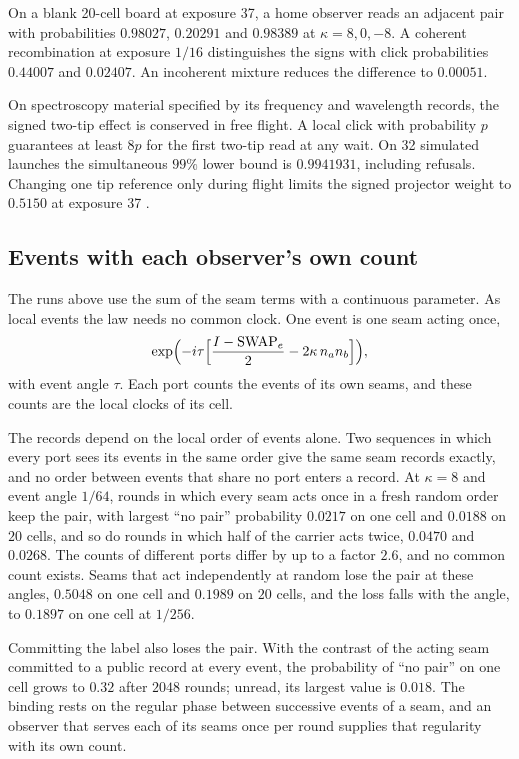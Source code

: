 \documentclass[11pt]{article}
\theoremstyle{definition}
\theoremstyle{remark}
\begin{document}
On a blank 20-cell board at exposure 37, a home observer reads an
adjacent pair with probabilities \(0.98027\), \(0.20291\) and \(0.98389\)
at \(\kappa=8,0,-8\). A coherent recombination at exposure \(1/16\)
distinguishes the signs with click probabilities \(0.44007\) and
\(0.02407\). An incoherent mixture reduces the difference to \(0.00051\).

On spectroscopy material specified by its frequency and wavelength
records, the signed two-tip effect is conserved in free flight. A local
click with probability \(p\) guarantees at least \(8p\) for the first
two-tip read at any wait. On 32 simulated launches the simultaneous
\(99\%\) lower bound is \(0.9941931\), including refusals. Changing one
tip reference only during flight limits the signed projector weight to
\(0.5150\) at exposure 37 \cite{ophspine}.

\subsection{Events with each observer's own count}
\label{sec:events}

The runs above use the sum of the seam terms with a continuous parameter.
As local events the law needs no common clock. One event is one seam
acting once,
\begin{equation}
 \exp\Bigl(-i\tau\Bigl[\frac{I-\mathrm{SWAP}_e}{2}-2\kappa\,n_an_b\Bigr]\Bigr),
\label{eq:seam-event-unitary}
\end{equation}
with event angle $\tau$. Each port counts the events of its own seams, and
these counts are the local clocks of its cell.

The records depend on the local order of events alone. Two sequences in
which every port sees its events in the same order give the same seam
records exactly, and no order between events that share no port enters a
record. At $\kappa=8$ and event angle $1/64$, rounds in which every seam
acts once in a fresh random order keep the pair, with largest ``no pair''
probability $0.0217$ on one cell and $0.0188$ on $20$ cells, and so do
rounds in which half of the carrier acts twice, $0.0470$ and $0.0268$.
The counts of
different ports differ by up to a factor $2.6$, and no common count
exists. Seams that act independently at random lose the pair at these
angles, $0.5048$ on one cell and $0.1989$ on $20$ cells, and the loss
falls with the angle, to $0.1897$ on one cell at $1/256$.

Committing the label also loses the pair. With the contrast of the acting
seam committed to a public record at every event, the probability of ``no
pair'' on one cell grows to $0.32$ after $2048$ rounds; unread, its
largest value is $0.018$. The binding rests on the regular phase between
successive events of a seam, and an observer that serves each of its
seams once per round supplies that regularity with its own count.
\end{document}
